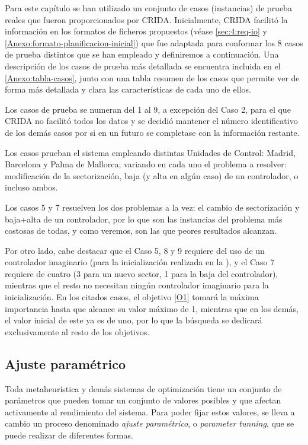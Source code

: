 Para este capítulo se han utilizado un conjunto de casos (instancias) de prueba reales que fueron proporcionados por CRIDA. Inicialmente, CRIDA facilitó la información en los formatos de ficheros propuestos (véase \autoref{sec:4:req-io} y \autoref{Anexo:formato-planificacion-inicial}) que fue adaptada para conformar los 8 casos de prueba distintos que se han empleado y definiremos a continuación. Una descripción de los casos de prueba más detallada se encuentra incluida en el \autoref{Anexo:tabla-casos}, junto con una tabla resumen de los casos que permite ver de forma más detallada y clara las características de cada uno de ellos.

Los casos de prueba se numeran del 1 al 9, a excepción del Caso 2, para el que \gls{CRIDA} no facilitó todos los datos y se decidió mantener el número identificativo de los demás casos por si en un futuro se completase con la información restante.

Los casos prueban el sistema empleando distintas Unidades de Control: Madrid, Barcelona y Palma de Mallorca; variando en cada uno el problema a resolver: modificación de la sectorización, baja (y alta en algún caso) de un controlador, o incluso ambos.

Los casos 5 y 7 resuelven los dos problemas a la vez: el cambio de sectorización y baja+alta de un controlador, por lo que son las instancias del problema más costosas de todas, y como veremos, son las que peores resultados alcanzan.

Por otro lado, cabe destacar que el Caso 5, 8 y 9 requiere del uso de un controlador imaginario (para la inicialización realizada en la \faseuno{}), y el Caso 7 requiere de cuatro (3 para un nuevo sector, 1 para la baja del controlador), mientras que el resto no necesitan ningún controlador imaginario para la inicialización. En los citados casos, el objetivo \ref{O1} tomará la máxima importancia hasta que alcance su valor máximo de 1, mientras que en los demás, el valor inicial de este ya es de uno, por lo que la búsqueda se dedicará exclusivamente al resto de los objetivos.



\subsection{Ajuste paramétrico}
Toda metaheurística y demás sistemas de optimización tiene un conjunto de parámetros que pueden tomar un conjunto de valores posibles y que afectan activamente al rendimiento del sistema. Para poder fijar estos valores, se lleva a cambio un proceso denominado \textit{ajuste paramétrico}, o \textit{parameter tunning}, que se puede realizar de diferentes formas.

